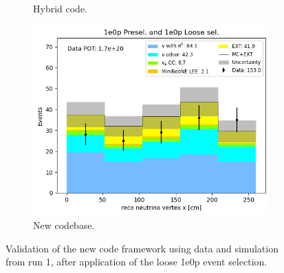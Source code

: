 \begin{figure}[H]
\begin{subfigure}[t]{0.32\linewidth}
        \caption{Hybrid code.}
    \end{subfigure}%
    \hspace{0.2cm}%
    \begin{subfigure}[t]{0.32\linewidth}
        \includegraphics[width=\linewidth]{technote/Appendix_Validation/Figures/1e0p_Loose/Run1_Vertex_X_Alex.png}
        \caption{New codebase.}
    \end{subfigure}
    \caption{Validation of the new code framework using data and simulation from run 1, after application of the loose 1e0p event selection.}
\end{figure}

